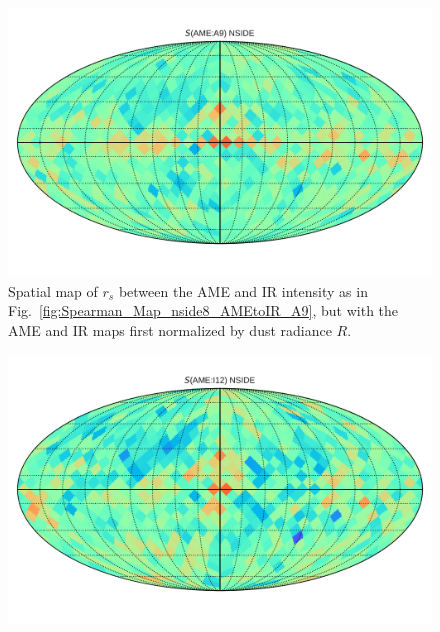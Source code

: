      \begin{figure}
       \includegraphics[width=\textwidth]{../Plots/Allsky_Corr/RadNorm/Spearman_Map_nside8_AMEtoA9.pdf}
       \centering
       \caption{Spatial map of $r_{s}$ between the AME and IR intensity as in Fig.~\ref{fig:Spearman_Map_nside8_AMEtoIR_A9}, but with the AME and IR maps first normalized by dust radiance $R$.}
       \label{fig:Spearman_Map_nside8_AMEtoIR_radnorm_A9}
      \end{figure}
       \begin{figure}
        \includegraphics[width=\textwidth]{../Plots/Allsky_Corr/RadNorm/Spearman_Map_nside8_AMEtoI12.pdf}
        \centering
        \caption{}
        \label{fig:Spearman_Map_nside8_AMEtoIR_radnorm_I12}
      \end{figure}
